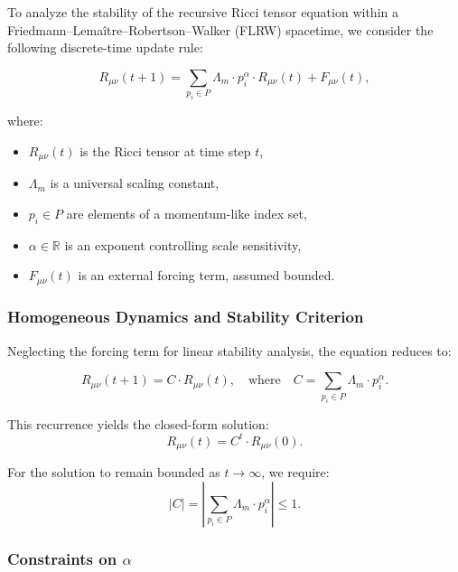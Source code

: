 \documentclass[12pt]{article}
\theoremstyle{plain}
\begin{document}
To analyze the stability of the recursive Ricci tensor equation within a Friedmann–Lemaître–Robertson–Walker (FLRW) spacetime, we consider the following discrete-time update rule:

\begin{equation}
R_{\mu\nu}(t+1) = \sum_{p_i \in P} \Lambda_m \cdot p_i^\alpha \cdot R_{\mu\nu}(t) + F_{\mu\nu}(t),
\end{equation}

where:
\begin{itemize}
    \item $R_{\mu\nu}(t)$ is the Ricci tensor at time step $t$,
    \item $\Lambda_m$ is a universal scaling constant,
    \item $p_i \in P$ are elements of a momentum-like index set,
    \item $\alpha \in \mathbb{R}$ is an exponent controlling scale sensitivity,
    \item $F_{\mu\nu}(t)$ is an external forcing term, assumed bounded.
\end{itemize}

\subsubsection*{Homogeneous Dynamics and Stability Criterion}

Neglecting the forcing term for linear stability analysis, the equation reduces to:

\begin{equation}
R_{\mu\nu}(t+1) = C \cdot R_{\mu\nu}(t), \quad \text{where} \quad C = \sum_{p_i \in P} \Lambda_m \cdot p_i^\alpha.
\end{equation}

This recurrence yields the closed-form solution:
\begin{equation}
R_{\mu\nu}(t) = C^t \cdot R_{\mu\nu}(0).
\end{equation}

For the solution to remain bounded as $t \to \infty$, we require:
\begin{equation}
|C| = \left| \sum_{p_i \in P} \Lambda_m \cdot p_i^\alpha \right| \leq 1.
\end{equation}

\subsubsection*{Constraints on $\alpha$}
\end{document}
